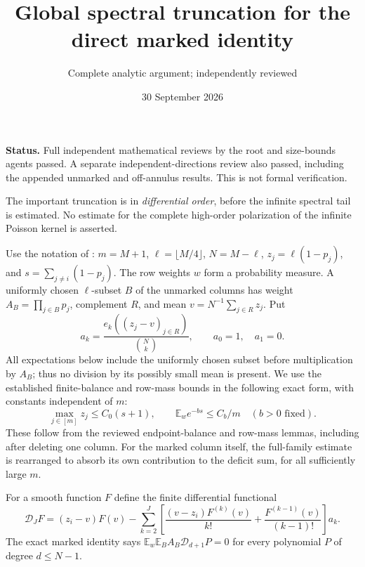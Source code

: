\documentclass[11pt]{article}
\title{Global spectral truncation for the direct marked identity}
\author{Complete analytic argument; independently reviewed}
\date{30 September 2026}
\newcommand{\E}{\mathbb E}
\begin{document}
\maketitle
\noindent\textbf{Status.} Full independent mathematical reviews by the root and size-bounds agents passed. A separate independent-directions review also passed, including the appended unmarked and off-annulus results. This is not formal verification.

The important truncation is in \emph{differential order}, before the
infinite spectral tail is estimated. No estimate for the complete
high-order polarization of the infinite Poisson kernel is asserted.

Use the notation of
:
$m=M+1$, $\ell=\lfloor M/4\rfloor$, $N=M-\ell$,
$z_j=\ell(1-p_j)$, and $s=\sum_{j\ne i}(1-p_j)$.
The row weights $w$ form a probability measure. A uniformly chosen
$\ell$-subset $B$ of the unmarked columns has weight
$A_B=\prod_{j\in B}p_j$, complement $R$, and mean
$v=N^{-1}\sum_{j\in R}z_j$. Put
\[
 a_k=\frac{e_k((z_j-v)_{j\in R})}{\binom Nk},\qquad
 a_0=1,\quad a_1=0.
\]
All expectations below include the uniformly chosen subset before
multiplication by $A_B$; thus no division by its possibly small mean
is present. We use the established finite-balance and row-mass bounds
in the following exact form, with constants independent of $m$:
\begin{equation}\label{inputs}
 \max_{j\in[m]}z_j\le C_0(s+1),\qquad
 \E_w e^{-b s}\le C_b/m\quad(b>0\text{ fixed}).
\end{equation}
These follow from the reviewed endpoint-balance and row-mass lemmas,
including after deleting one column. For the marked column itself,
the full-family estimate is rearranged to absorb its own contribution
to the deficit sum, for all sufficiently large $m$.

For a smooth function $F$ define the finite differential functional
\[
 \mathcal D_J F=(z_i-v)F(v)
 -\sum_{k=2}^{J}
 \left[\frac{(v-z_i)F^{(k)}(v)}{k!}
            +\frac{F^{(k-1)}(v)}{(k-1)!}\right]a_k.
\]
The exact marked identity says
$\E_w\E_B A_B\mathcal D_{d+1}P=0$ for every polynomial $P$ of
degree $d\le N-1$.
\end{document}
